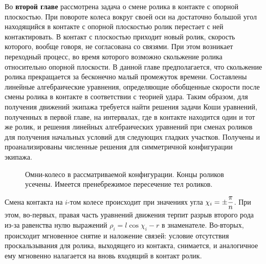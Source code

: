 
Во \textbf{второй главе} рассмотрена задача о смене ролика в контакте с опорной плоскостью. При повороте колеса вокруг своей оси на достаточно большой угол находящийся в контакте с опорной плоскостью ролик перестает с ней контактировать. В контакт с плоскостью приходит новый ролик, скорость которого, вообще говоря, не согласована со связями. При этом возникает переходный процесс, во время которого возможно скольжение ролика относительно опорной плоскости. В данной главе предполагается, что скольжение ролика прекращается за бесконечно малый промежуток времени. Составлены линейные алгебраические уравнения, определяющие обобщенные скорости после смены ролика в контакте в соответствии с теорией удара. Таким образом, для получения движений экипажа требуется найти решения задачи Коши уравнений, полученных в первой главе, на интервалах, где в контакте находится один и тот же ролик, и решения линейных алгебраических уравнений при сменах роликов для получения начальных условий для следующих гладких участков. Получены и проанализированы численные решения для симметричной конфигурации экипажа.



\begin{figure}
    \minipage{\textwidth}
        \centering
        \caption{Омни-колесо в рассматриваемой конфигурации. Концы роликов усечены. Имеется пренебрежимое пересечение тел роликов.}
        \label{fig:overlap}
    \endminipage
\end{figure}

Смена контакта на $i$-том колесе происходит при значениях угла $\chi_i = \pm\displaystyle\frac{\displaystyle \pi}{\displaystyle n}$. При этом, во-первых, правая часть уравнений движения терпит разрыв второго рода из-за равенства нулю выражений $\rho_i = l\cos\chi_i-r$ в знаменателе. Во-вторых, происходит мгновенное снятие и наложение связей: условие отсутствия проскальзывания для ролика, выходящего из контакта, снимается, и аналогичное ему мгновенно налагается на вновь входящий в контакт ролик.

